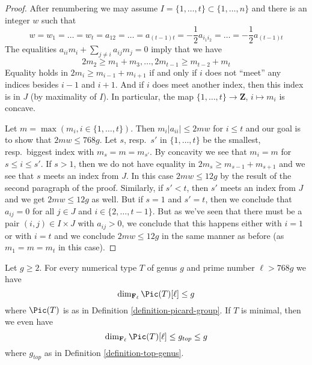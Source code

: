 \begin{proof}
\medskip\noindent
After renumbering we may assume $I = \{1, \ldots, t\} \subset \{1, \ldots, n\}$
and there is an integer $w$ such that
$$
w = w_1 = \ldots = w_t =
a_{12} = \ldots = a_{(t - 1) t} =
-\frac{1}{2} a_{i_1i_2} = \ldots = -\frac{1}{2} a_{(t - 1) t}
$$
The equalities $a_{ii}m_i + \sum_{j \not = i} a_{ij}m_j = 0$ imply
that we have
$$
2m_2 \geq m_1 + m_3, \ldots, 2m_{t - 1} \geq m_{t - 2} + m_t
$$
Equality holds in $2m_i \geq m_{i - 1} + m_{i + 1}$
if and only if $i$ does not ``meet'' any indices besides
$i - 1$ and $i + 1$. And if $i$ does meet
another index, then this index is in $J$ (by maximality of $I$).
In particular, the map
$\{1, \ldots, t\} \to \mathbf{Z}$, $i \mapsto m_i$ is concave.

\medskip\noindent
Let $m = \max(m_i, i \in \{1, \ldots, t\})$. Then
$m_i|a_{ii}| \leq 2mw$ for $i \leq t$ and
our goal is to show that $2mw \leq 768g$.
Let $s$, resp.\ $s'$ in $\{1, \ldots, t\}$ be the
smallest, resp.\ biggest index with $m_s = m = m_{s'}$.
By concavity we see that $m_i = m$ for $s \leq i \leq s'$.
If $s > 1$, then we do not have equality in
$2m_s \geq m_{s - 1} + m_{s + 1}$
and we see that $s$ meets an index from $J$.
In this case $2mw \leq 12g$ by the result of the second paragraph
of the proof.
Similarly, if $s' < t$, then $s'$ meets an index from $J$
and we get $2mw \leq 12g$ as well.
But if $s = 1$ and $s' = t$, then we conclude
that $a_{ij} = 0$ for all $j \in J$ and $i \in \{2, \ldots, t - 1\}$.
But as we've seen that there must be a pair $(i, j) \in I \times J$
with $a_{ij} > 0$, we conclude that this happens either with
$i = 1$ or with $i = t$ and we conclude $2mw \leq 12g$
in the same manner as before (as $m_1 = m = m_t$ in this case).
\end{proof}

\begin{proposition}
\label{proposition-bound-picard-group}
Let $g \geq 2$. For every numerical type $T$ of genus $g$
and prime number $\ell > 768g$ we have
$$
\dim_{\mathbf{F}_\ell} \Pic(T)[\ell] \leq g
$$
where $\Pic(T)$ is as in Definition \ref{definition-picard-group}.
If $T$ is minimal, then we even have
$$
\dim_{\mathbf{F}_\ell} \Pic(T)[\ell] \leq g_{top} \leq g
$$
where $g_{top}$ as in Definition \ref{definition-top-genus}.
\end{proposition}

